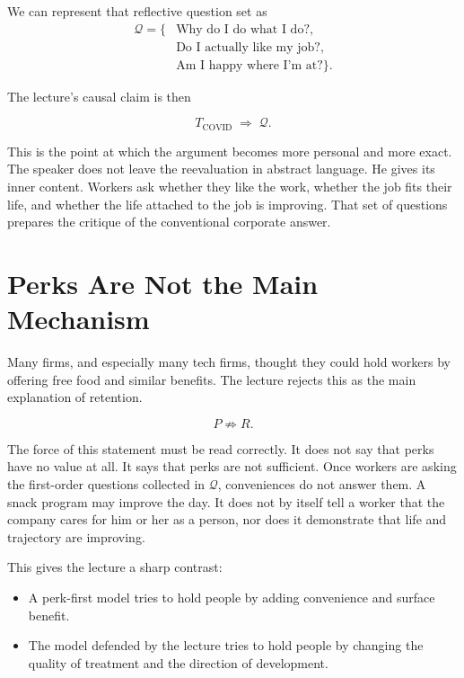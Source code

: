 We can represent that reflective question set as
\begin{align}
\mathcal{Q} = \{&
\text{Why do I do what I do?},\nonumber\\
&\text{Do I actually like my job?},\nonumber\\
&\text{Am I happy where I'm at?}\}.
\end{align}

The lecture's causal claim is then

\begin{equation}
T_{\text{COVID}} \;\Rightarrow\; \mathcal{Q}.
\end{equation}

This is the point at which the argument becomes more personal and more exact. The speaker does not leave the reevaluation in abstract language. He gives its inner content. Workers ask whether they like the work, whether the job fits their life, and whether the life attached to the job is improving. That set of questions prepares the critique of the conventional corporate answer.

\section{Perks Are Not the Main Mechanism}

Many firms, and especially many tech firms, thought they could hold workers by offering free food and similar benefits. The lecture rejects this as the main explanation of retention.

\begin{equation}
P \not\Rightarrow R .
\end{equation}

The force of this statement must be read correctly. It does not say that perks have no value at all. It says that perks are not sufficient. Once workers are asking the first-order questions collected in \(\mathcal{Q}\), conveniences do not answer them. A snack program may improve the day. It does not by itself tell a worker that the company cares for him or her as a person, nor does it demonstrate that life and trajectory are improving.

This gives the lecture a sharp contrast:
\begin{itemize}
\item A perk-first model tries to hold people by adding convenience and surface benefit.
\item The model defended by the lecture tries to hold people by changing the quality of treatment and the direction of development.
\end{itemize}

